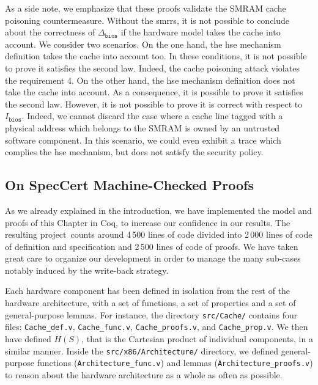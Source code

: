 As a side note, we emphasize that these proofs validate the SMRAM cache
poisoning countermeasure.
%
Without the \acp{smrr}, it is not possible to conclude about the correctness of
\( \Delta_{\mathtt{bios}} \) if the hardware model takes the cache into account.
%
We consider two scenarios.
%
On the one hand, the \ac{hse} mechanism definition takes the cache into account
too.
%
In these conditions, it is not possible to prove it satisfies the second law.
%
Indeed, the cache poisoning attack violates the requirement 4.
%
On the other hand, the \ac{hse} mechanism definition does not take the cache
into account.
%
As a consequence, it is possible to prove it satisfies the second law.
%
However, it is not possible to prove it is correct with respect to
$I_{\mathtt{bios}}$.
%
Indeed, we cannot discard the case where a cache line tagged with a physical
address which belongs to the SMRAM is owned by an untrusted software component.
%
In this scenario, we could even exhibit a trace which complies the \ac{hse}
mechanism, but does not satisfy the security policy.

\subsection{On SpecCert Machine-Checked Proofs}
\label{subsec:speccert2:coqproofs}

As we already explained in the introduction, we have implemented the model and
proofs of this Chapter in Coq, to increase our confidence in our results.
%
The resulting project\,\cite{letan2016speccertcode} counts around 4\,500 lines
of code divided into 2\,000 lines of code of definition and specification and
2\,500 lines of code of proofs.
%
We have taken great care to organize our development in order to manage the
many sub-cases notably induced by the write-back strategy.

Each hardware component has been defined in isolation from the rest of the
hardware architecture, with a set of functions, a set of properties and a set of
general-purpose lemmas.
%
For instance, the directory \texttt{src/Cache/} contains four files:
\texttt{Cache\_def.v}, \texttt{Cache\_func.v}, \texttt{Cache\_proofs.v}, and
\texttt{Cache\_prop.v}.
%
We then have defined \( H(S) \), that is the Cartesian product of individual
components, in a similar manner.
%
Inside the \texttt{src/x86/Architecture/} directory, we defined general-purpose
functions (\texttt{Architecture\_func.v}) and lemmas
(\texttt{Architecture\_proofs.v}) to reason about the hardware architecture as a
whole as often as possible.

